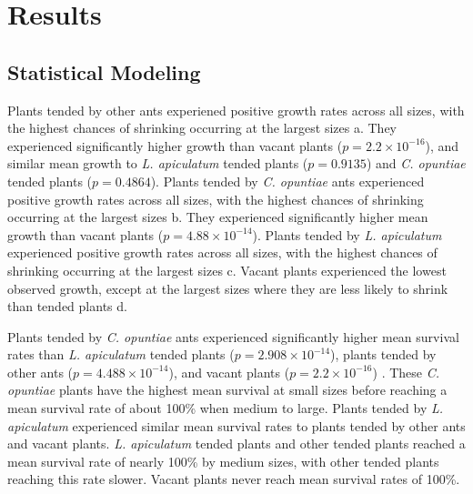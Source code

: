 \documentclass[11pt]{article}
\begin{document}
{{    
  
\section*{Results}
\subsection*{Statistical Modeling}

Plants tended by other ants experiened positive growth rates across all sizes, with the highest chances of shrinking occurring at the largest sizes \cite{fig:growth}a.
They experienced significantly higher growth than vacant plants ($p = 2.2 \times 10^{-16}$), and similar mean growth to \textit{L. apiculatum} tended plants ($p = 0.9135$) and \textit{C. opuntiae} tended plants ($p = 0.4864$).  
Plants tended by \textit{C. opuntiae} ants experienced positive growth rates across all sizes, with the highest chances of shrinking occurring at the largest sizes \cite{fig:growth}b.
They experienced significantly higher mean growth than vacant plants ($p = 4.88 \times 10^{-14}$).
Plants tended by \textit{L. apiculatum} experienced positive growth rates across all sizes, with the highest chances of shrinking occurring at the largest sizes \cite{fig:growth}c.
Vacant plants experienced the lowest observed growth, except at the largest sizes where they are less likely to shrink than tended plants \cite{fig:growth}d. 

Plants tended by \textit{C. opuntiae} ants experienced significantly higher mean survival rates than \textit{L. apiculatum} tended plants ($p = 2.908 \times 10^{-14}$), plants tended by other ants ($p = 4.488 \times 10^{-14}$), and vacant plants ($p = 2.2 \times 10^{-16}$) \cite{fig:surv}. 
These \textit{C. opuntiae} plants have the highest mean survival at small sizes before reaching a mean survival rate of about 100\% when medium to large.
Plants tended by \textit{L. apiculatum} experienced similar mean survival rates to plants tended by other ants and vacant plants.
\textit{L. apiculatum} tended plants and other tended plants reached a mean survival rate of nearly 100\% by medium sizes, with other tended plants reaching this rate slower. 
Vacant plants never reach mean survival rates of 100\%. 

}}
\end{document}
